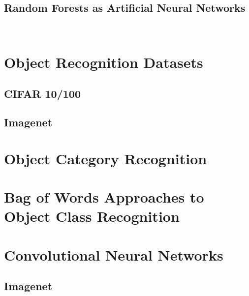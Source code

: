 \documentclass[thesis]{subfiles}
\begin{document}
\subsection{Random Forests as Artificial Neural Networks}
~\cite{Welbl2014casting}

\section{Object Recognition Datasets}
\subsection{CIFAR 10/100}
\subsection{Imagenet}

\section{Object Category Recognition}
\section[Bag of Words]{Bag of Words Approaches to Object Class Recognition}

\section{Convolutional Neural Networks}
\subsection{Imagenet}
\end{document}

